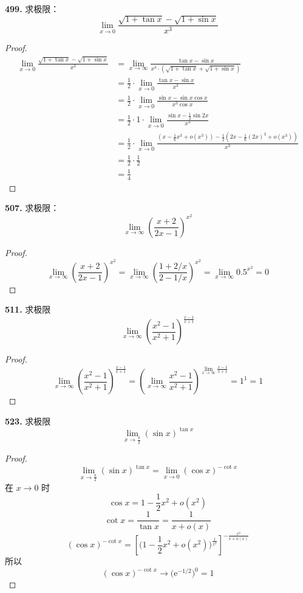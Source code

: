 \textbf{499.} 求极限：
\[\lim_{x \rightarrow 0} \frac{\sqrt{1 + \tan x} - \sqrt{1 + \sin x}}{x^3}\]
\begin{proof}
    \begin{align*}
        \lim_{x \rightarrow 0} \frac{\sqrt{1 + \tan x} - \sqrt{1 + \sin x}}{x^3} &= \lim_{x \rightarrow \infty} \frac{\tan x - \sin x}{x^3 \cdot \left(\sqrt{1 + \tan x} + \sqrt{1 + \sin x}\right)}\\
        &= \frac{1}{2} \cdot \lim_{x \rightarrow 0} \frac{\tan x - \sin x}{x^3}\\
        &= \frac{1}{2} \cdot \lim_{x \rightarrow 0} \frac{\sin x - \sin x \cos x}{x^3 \cos x}\\
        &= \frac{1}{2} \cdot 1 \cdot \lim_{x \rightarrow 0} \frac{\sin x - \frac{1}{2}\sin 2x}{x^3}\\
        &= \frac{1}{2} \cdot \lim_{x \rightarrow 0} \frac{\left(x - \frac{1}{6}x^3 + o(x^3)\right) - \frac{1}{2}\left(2x - \frac{1}{6}(2x)^3 + o(x^3)\right)}{x^3}\\
        &= \frac{1}{2} \cdot \frac{1}{2}\\
        &= \frac{1}{4}
    \end{align*}
\end{proof}\vspace{9pt}

\textbf{507.} 求极限：
\[\lim_{x \rightarrow \infty} \left(\frac{x + 2}{2x - 1}\right)^{x^2}\]
\begin{proof}
    \[\lim_{x \rightarrow \infty} \left(\frac{x + 2}{2x - 1}\right)^{x^2} = \lim_{x \rightarrow \infty} \left(\frac{1 + 2/x}{2 - 1/x}\right)^{x^2} = \lim_{x \rightarrow \infty} 0.5^{x^2} = 0\]
\end{proof}\vspace{9pt}

\textbf{511.} 求极限
\[\lim_{x \rightarrow \infty} \left(\frac{x^2 - 1}{x^2 + 1}\right)^{\frac{x-1}{x+1}}\]
\begin{proof}
    \[\lim_{x \rightarrow \infty} \left(\frac{x^2 - 1}{x^2 + 1}\right)^{\frac{x-1}{x+1}} = \left(\lim_{x \rightarrow \infty} \frac{x^2 - 1}{x^2 + 1}\right)^{\lim_{x \rightarrow \infty} \frac{x-1}{x+1}} = 1^1 = 1\]
\end{proof}\vspace{9pt}

\textbf{523.} 求极限
\[\lim_{x \rightarrow \frac{\pi}{2}} (\sin x)^{\tan x}\]
\begin{proof}
    \[\lim_{x \rightarrow \frac{\pi}{2}} (\sin x)^{\tan x} = \lim_{x \rightarrow 0} (\cos x)^{-\cot x}\]
    在 $x \rightarrow 0$ 时
    \[\cos x = 1 - \frac{1}{2}x^2 + o(x^2)\]
    \[\cot x = \frac{1}{\tan x} = \frac{1}{x + o(x)}\]
    \[(\cos x)^{-\cot x} = \left[\biggl(1 - \frac{1}{2}x^2 + o(x^2)\biggr)^{\frac{1}{x^2}}\right]^{-\frac{x^2}{x + o(x)}}\]
    所以
    \[(\cos x)^{-\cot x} \rightarrow \bigl(\mathrm{e}^{-1/2}\bigr)^0 = 1\]
\end{proof}\vspace{9pt}

